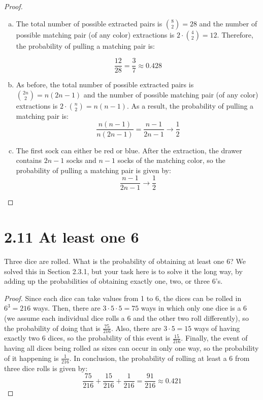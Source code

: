 \vspace{1em}

\begin{proof}
    \hfill
    \begin{enumerate}[(a)]
        \item The total number of possible extracted pairs is $\binom{8}{2} = 28$ and the number
            of possible matching pair (of any color) extractions is $2 \cdot \binom{4}{2} = 12$. 
            Therefore, the probability of pulling a matching pair is:
            
            \[
                \frac{12}{28} = \frac{3}{7} \approx 0.428
            \] 

        \item As before, the total number of possible extracted pairs is $\binom{2n}{2} = n(2n - 1)$ and
            the number of possible matching pair (of any color) extractions is 
            $2 \cdot \binom{n}{2} = n(n - 1)$. As a result, the probability of pulling a 
            matching pair is:
            \[
                \frac{n(n-1)}{n(2n - 1)} = \frac{n - 1}{2n - 1} \to \frac{1}{2}
            \] 
        \item The first sock can either be red or blue. After the extraction, the drawer contains
            $2n - 1$ socks and $n - 1$ socks of the matching color, so the probability of pulling
            a matching pair is given by:
            \[
                \frac{n - 1}{2n - 1} \to \frac{1}{2}
            \] 
    \end{enumerate}
\end{proof}

\section*{2.11 At least one 6}
Three dice are rolled. What is the probability of obtaining at least one 6? We solved
this in Section 2.3.1, but your task here is to solve it the long way, by adding up the
probabilities of obtaining exactly one, two, or three 6's.

\begin{proof}
    Since each dice can take values from 1 to 6, the dices can be rolled in $6^3 = 216$ ways. 
    Then, there are $3 \cdot 5 \cdot 5 = 75$ ways in which only one dice is a 6 (we assume
    each individual dice rolls a 6 and the other two roll differently), so the probability 
    of doing that is $\frac{75}{216}$. Also, there are $3 \cdot 5 = 15$  
    ways of having exactly two 6 dices, so the probability of this event is $\frac{15}{216}$. 
    Finally, the event of having all dices being rolled as sixes can occur in only one way, so the 
    probability of it happening is $\frac{1}{216}$. In conclusion, the probability of rolling at least a 6 
    from three dice rolls is given by:
    \[
        \frac{75}{216} + \frac{15}{216} + \frac{1}{216} = \frac{91}{216} \approx 0.421
    \] 
\end{proof}

